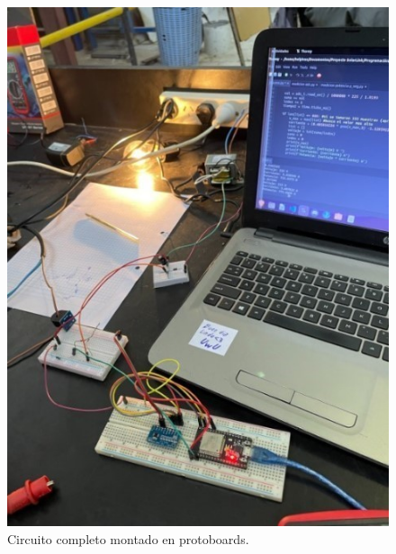 \begin{figure}[H]
    \centering
    \includegraphics[width=0.5\linewidth]{informes/Screenshot_7.jpg}
    \caption{Circuito completo montado en protoboards.}
\end{figure}

